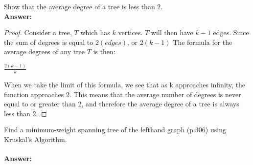 \documentclass[12pt,letterpaper]{exam}
\begin{document}
\begin{questions}
\begin{parts}
\end{parts}














\question[10,2]
Show that the average degree of a tree is less than $2$.
\\
\textbf{Answer:}
\begin{proof}
Consider a tree, $T$ which has $k$ vertices. $T$ will then have $k-1$ edges. Since the sum of degrees is equal to $2(edges)$, or $2(k-1)$ The formula for the average degrees of any tree $T$ is then:
\begin{center}
$\frac{2(k-1)}{k}$\\
\end{center}When we take the limit of this formula, we see that as k approaches infinity, the function approaches 2. This means that the average number of degrees is never equal to or greater than 2, and therefore the average degree of a tree is always less than 2.
\end{proof}


\question[10,7]
Find a minimum-weight spanning tree of the lefthand graph (p.306) using Kruskal's Algorithm.\\
\\
\textbf{Answer:}


\end{questions}
\end{document}

